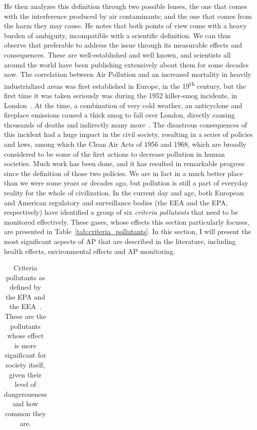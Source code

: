He then analyzes this definition through two possible lenses, the one
that comes with the interference produced by air contaminants; and the
one that comes from the harm they may cause. He notes that both points
of view come with a heavy burden of ambiguity, incompatible with a
scientific definition. We can thus observe that preferable to address
the issue through its measurable effects and consequences. These are
well-established and well known, and scientists all around the world
have been publishing extensively about them for some decades now. The
correlation between Air Pollution and an increased mortality in heavily
industrialized areas was first established in Europe, in the
19\textsuperscript{th} century, but the first time it was taken
seriously was during the 1952 killer-smog incidents, in
London~\cite{Platt2007}. At the time, a combination of very cold
weather, an anticyclone and fireplace emissions caused a thick smog to
fall over London, directly causing thousands of deaths and indirectly
many more~\cite{Bell2008,Office2019}. The disastrous consequences of
this incident had a huge impact in the civil society, resulting in a
series of policies and laws, among which the Clean Air Acts of 1956 and
1968, which are broadly considered to be some of the first actions to
decrease pollution in human societies. Much work has been done, and it
has resulted in remarkable progress since the definition of those two
policies. We are in fact in a much better place than we were some years
or decades ago, but pollution is still a part of everyday reality for
the whole of civilization. In the current day and age, both European and
American regulatory and surveillance bodies (the \gls{EEA} and the
\gls{EPA}, respectively) have identified a group of six \emph{criteria
pollutants} that need to be monitored effectively. These gases, whose
effects this section particularly focuses, are presented in
Table~\ref{tab:criteria_pollutants}. In this section, I will present the
most significant aspects of \gls{AP} that are described in the
literature, including health effects, environmental effects and
\acrlong{AP} monitoring.

\begin{table}[htpb]
    \centering
    \caption{Criteria pollutants as defined by the EPA and the
    EEA~\cite{CABI2019}. These are the pollutants whose effect is more
    significant for society itself, given their level of dangerousness and
    how common they are.}
    \label{tab:label}
    \begin{tabular}{c}
    
    \end{tabular}
\end{table}

